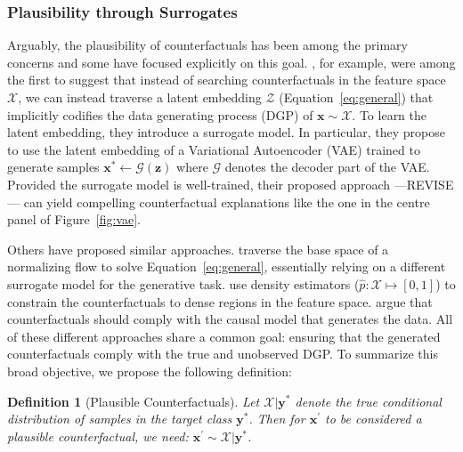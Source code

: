 \documentclass{article}
\newtheorem{definition}{Definition}[section]
\begin{document}
\subsubsection{Plausibility through Surrogates}

Arguably, the plausibility of counterfactuals has been among the primary concerns and some have focused explicitly on this goal. \citet{joshi2019realistic}, for example, were among the first to suggest that instead of searching counterfactuals in the feature space $\mathcal{X}$, we can instead traverse a latent embedding $\mathcal{Z}$ (Equation~\ref{eq:general}) that implicitly codifies the data generating process (DGP) of $\mathbf{x}\sim\mathcal{X}$. To learn the latent embedding, they introduce a surrogate model. In particular, they propose to use the latent embedding of a Variational Autoencoder (VAE) trained to generate samples $\mathbf{x}^* \leftarrow \mathcal{G}(\mathbf{z})$ where $\mathcal{G}$ denotes the decoder part of the VAE. Provided the surrogate model is well-trained, their proposed approach ---REVISE--- can yield compelling counterfactual explanations like the one in the centre panel of Figure~\ref{fig:vae}. 

Others have proposed similar approaches. \citet{dombrowski2021diffeomorphic} traverse the base space of a normalizing flow to solve Equation~\ref{eq:general}, essentially relying on a different surrogate model for the generative task. \citet{poyiadzi2020face} use density estimators ($\hat{p}: \mathcal{X} \mapsto [0,1]$) to constrain the counterfactuals to dense regions in the feature space. \citet{karimi2021algorithmic} argue that counterfactuals should comply with the causal model that generates the data. All of these different approaches share a common goal: ensuring that the generated counterfactuals comply with the true and unobserved DGP. To summarize this broad objective, we propose the following definition:

\begin{definition}[Plausible Counterfactuals]
  \label{def:plausible}
  Let $\mathcal{X}|\mathbf{y}^*$ denote the true conditional distribution of samples in the target class $\mathbf{y}^*$. Then for $\mathbf{x}^{\prime}$ to be considered a plausible counterfactual, we need: $\mathbf{x}^{\prime} \sim \mathcal{X}|\mathbf{y}^*$.
\end{definition}
\end{document}
